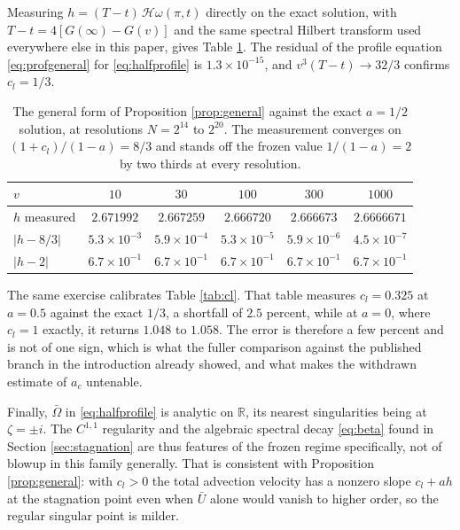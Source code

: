 \documentclass[11pt]{article}
\theoremstyle{definition}
\newcommand{\Real}{\mathbb{R}}
\newcommand{\Hil}{\mathcal{H}}
\newcommand{\abs}[1]{\left\lvert #1 \right\rvert}
\newcommand{\Ub}{\bar{U}}
\newcommand{\Ob}{\bar{\Omega}}
\begin{document}
Measuring $h = (T-t)\,\Hil\omega(\pi,t)$ directly on the exact solution, with
$T-t = 4[G(\infty)-G(v)]$ and the same spectral Hilbert transform used
everywhere else in this paper, gives Table \ref{tab:halfh}. The residual of the
profile equation \eqref{eq:profgeneral} for \eqref{eq:halfprofile} is
$1.3\times10^{-15}$, and $v^3(T-t)\to32/3$ confirms $c_l = 1/3$.

\begin{table}[htbp]
\centering
\begin{tabular}{lccccc}
\toprule
$v$ & $10$ & $30$ & $100$ & $300$ & $1000$\\
\midrule
$h$ measured & $2.671992$ & $2.667259$ & $2.666720$ & $2.666673$ & $2.6666671$\\
$\abs{h - 8/3}$ & $5.3\times10^{-3}$ & $5.9\times10^{-4}$ & $5.3\times10^{-5}$
  & $5.9\times10^{-6}$ & $4.5\times10^{-7}$\\
$\abs{h - 2}$ & $6.7\times10^{-1}$ & $6.7\times10^{-1}$ & $6.7\times10^{-1}$
  & $6.7\times10^{-1}$ & $6.7\times10^{-1}$\\
\bottomrule
\end{tabular}
\caption{The general form of Proposition \ref{prop:general} against the exact
$a=1/2$ solution, at resolutions $N = 2^{14}$ to $2^{20}$. The measurement
converges on $(1+c_l)/(1-a) = 8/3$ and stands off the frozen value
$1/(1-a) = 2$ by two thirds at every resolution.}
\label{tab:halfh}
\end{table}

The same exercise calibrates Table \ref{tab:cl}. That table measures
$c_l = 0.325$ at $a=0.5$ against the exact $1/3$, a shortfall of $2.5$ percent,
while at $a=0$, where $c_l=1$ exactly, it returns $1.048$ to $1.058$. The error
is therefore a few percent and is not of one sign, which is what the fuller
comparison against the published branch in the introduction already showed, and
what makes the withdrawn estimate of $a_c$ untenable.

Finally, $\Ob$ in \eqref{eq:halfprofile} is analytic on $\Real$, its nearest
singularities being at $\zeta = \pm i$. The $C^{1,1}$ regularity and the
algebraic spectral decay \eqref{eq:beta} found in Section \ref{sec:stagnation}
are thus features of the frozen regime specifically, not of blowup in this
family generally. That is consistent with Proposition \ref{prop:general}: with
$c_l>0$ the total advection velocity has a nonzero slope $c_l + a h$ at the
stagnation point even when $\Ub$ alone would vanish to higher order, so the
regular singular point is milder.
\end{document}
